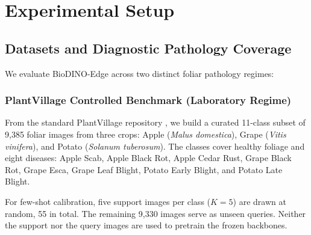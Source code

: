 \documentclass[preprint,12pt]{elsarticle}
\begin{document}
\section{Experimental Setup}
\label{sec:experiments_setup}

\subsection{Datasets and Diagnostic Pathology Coverage}
\label{sec:datasets}
We evaluate BioDINO-Edge across two distinct foliar pathology regimes:

\subsubsection{PlantVillage Controlled Benchmark (Laboratory Regime)}
From the standard PlantVillage repository \cite{hughes2012plantvillage}, we build a curated 11-class subset of 9,385 foliar images from three crops: Apple (\textit{Malus domestica}), Grape (\textit{Vitis vinifera}), and Potato (\textit{Solanum tuberosum}). The classes cover healthy foliage and eight diseases: Apple Scab, Apple Black Rot, Apple Cedar Rust, Grape Black Rot, Grape Esca, Grape Leaf Blight, Potato Early Blight, and Potato Late Blight.

For few-shot calibration, five support images per class ($K=5$) are drawn at random, 55 in total. The remaining 9,330 images serve as unseen queries. Neither the support nor the query images are used to pretrain the frozen backbones.
\end{document}
